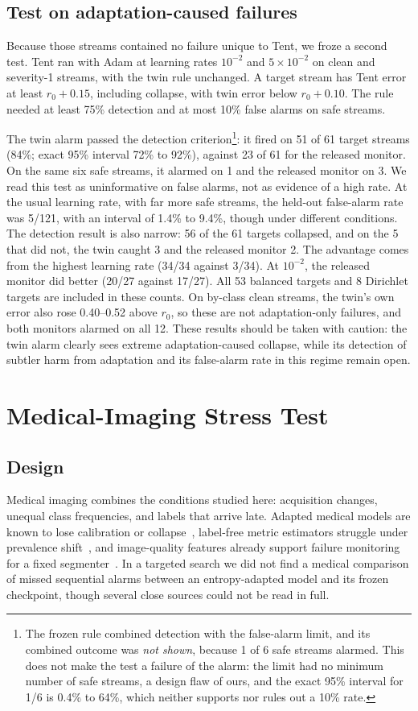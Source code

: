 \documentclass[runningheads]{llncs}
\begin{document}
\subsection{Test on adaptation-caused failures}
Because those streams contained no failure unique to Tent, we froze a second test. Tent ran with Adam at learning rates $10^{-2}$ and $5\times10^{-2}$ on clean and severity-1 streams, with the twin rule unchanged. A target stream has Tent error at least $r_0+0.15$, including collapse, with twin error below $r_0+0.10$. The rule needed at least 75\% detection and at most 10\% false alarms on safe streams.

The twin alarm passed the detection criterion\footnote{The frozen rule combined detection with the false-alarm limit, and its combined outcome was \emph{not shown}, because 1 of 6 safe streams alarmed. This does not make the test a failure of the alarm: the limit had no minimum number of safe streams, a design flaw of ours, and the exact 95\% interval for 1/6 is 0.4\% to 64\%, which neither supports nor rules out a 10\% rate.}: it fired on 51 of 61 target streams (84\%; exact 95\% interval 72\% to 92\%), against 23 of 61 for the released monitor. On the same six safe streams, it alarmed on 1 and the released monitor on 3. We read this test as uninformative on false alarms, not as evidence of a high rate. At the usual learning rate, with far more safe streams, the held-out false-alarm rate was 5/121, with an interval of 1.4\% to 9.4\%, though under different conditions. The detection result is also narrow: 56 of the 61 targets collapsed, and on the 5 that did not, the twin caught 3 and the released monitor 2. The advantage comes from the highest learning rate (34/34 against 3/34). At $10^{-2}$, the released monitor did better (20/27 against 17/27). All 53 balanced targets and 8 Dirichlet targets are included in these counts. On by-class clean streams, the twin's own error also rose 0.40--0.52 above $r_0$, so these are not adaptation-only failures, and both monitors alarmed on all 12. These results should be taken with caution: the twin alarm clearly sees extreme adaptation-caused collapse, while its detection of subtler harm from adaptation and its false-alarm rate in this regime remain open.

\section{Medical-Imaging Stress Test}
\subsection{Design}
Medical imaging combines the conditions studied here: acquisition changes, unequal class frequencies, and labels that arrive late. Adapted medical models are known to lose calibration or collapse~\cite{Li2026ECFR,Nielen2026DSBR}, label-free metric estimators struggle under prevalence shift~\cite{Fluhmann2025LabelFree}, and image-quality features already support failure monitoring for a fixed segmenter~\cite{Pham2026TCSR}. In a targeted search we did not find a medical comparison of missed sequential alarms between an entropy-adapted model and its frozen checkpoint, though several close sources could not be read in full.
\end{document}
